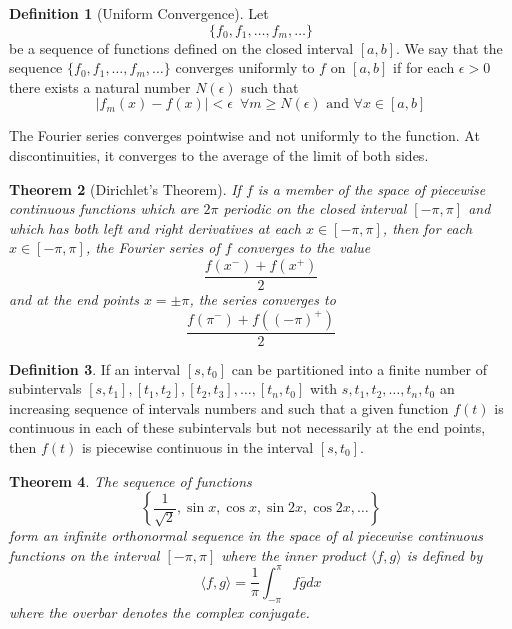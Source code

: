 \documentclass{report}
\newtheorem{theorem}{Theorem}[chapter]
\theoremstyle{definition}
\newtheorem{definition}[theorem]{Definition}
\theoremstyle{remark}
\begin{document}
\begin{definition}[Uniform Convergence]
    Let \begin{equation*}
        \{f_0,f_1,\ldots,f_m,\ldots\}
    \end{equation*}
    be a sequence of functions defined on the closed interval $[a,b]$. We say that the sequence $\{f_0,f_1,\ldots,f_m,\ldots\}$ converges uniformly to $f$ on $[a,b]$ if for each $\epsilon>0$ there exists a natural number $N(\epsilon)$ such that 
    \begin{equation*}
        |f_m(x)-f(x)|<\epsilon\,\,\,\forall m \geq N(\epsilon) \text{ and }\forall x\in [a,b]
    \end{equation*}
\end{definition}
The Fourier series converges pointwise and not uniformly to the function. At discontinuities, it converges to the average of the limit of both sides. 
\begin{theorem}[Dirichlet's Theorem]
    If $f$ is a member of the space of piecewise continuous functions which are $2\pi$ periodic on the closed interval $[-\pi,\pi]$ and which has both left and right derivatives at each $x\in [-\pi,\pi]$, then for each $x\in [-\pi,\pi]$, the Fourier series of $f$ converges to the value 
    \begin{equation*}
        \frac{f(x^-)+f(x^+)}{2}
    \end{equation*}
    and at the end points $x=\pm \pi$, the series converges to 
    \begin{equation*}
        \frac{f(\pi^-)+f((-\pi)^+)}{2}
    \end{equation*}
\end{theorem}
\begin{definition}
    If an interval $[s,t_0]$ can be partitioned into a finite number of subintervals $[s,t_1],[t_1,t_2],[t_2,t_3],\ldots,[t_n,t_0]$ with $s,t_1,t_2,\ldots,t_n,t_0$ an increasing sequence of intervals numbers and such that a given function $f(t)$ is continuous in each of these subintervals but not necessarily at the end points, then $f(t)$ is piecewise continuous in the interval $[s,t_0]$. 
\end{definition}
\begin{theorem}
    The sequence of functions 
    \begin{equation*}
        \left\{ \frac{1}{\sqrt{2}},\sin x,\cos x, \sin 2x, \cos 2x,\ldots\right\}
    \end{equation*}
    form an infinite orthonormal sequence in the space of al piecewise continuous functions on the interval $[-\pi,\pi]$ where the inner product $\langle f,g\rangle$ is defined by 
    \begin{equation*}
        \langle f,g \rangle = \frac{1}{\pi}\int^\pi_{-\pi} f\bar gdx
    \end{equation*}
    where the overbar denotes the complex conjugate.
\end{theorem}
\end{document}
